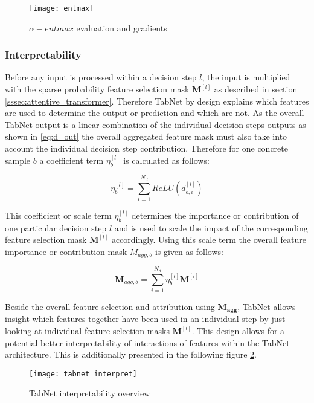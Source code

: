 \documentclass[../main.tex]{subfiles}
\begin{document}
\begin{figure}[H]
    \centering
    \texttt{[image: entmax]}    
    \caption{$\alpha-entmax$ evaluation and gradients}
    \label{fig:entmax}
\end{figure}

\subsubsection{Interpretability} \label{sssec:interpretability}

Before any input is processed within a decision step $l$, the input is multiplied with the sparse probability feature selection mask $\mathbf{M}^{[l]}$ as described in section \ref{sssec:attentive_transformer}. Therefore TabNet by design explains which features are used to determine the output or prediction and which are not. As the overall TabNet output is a linear combination of the individual decision steps outputs as shown in \ref{eq:d_out} the overall aggregated feature mask must also take into account the individual decision step contribution. Therefore for one concrete sample $b$ a coefficient term $\eta_b^{[l]}$ is calculated as follows:

\begin{equation}
    \eta_b^{[l]} = \sum_{i=1}^{N_d} ReLU(d_{b, i}^{[l]})
\end{equation}

This coefficient or scale term $\eta_b^{[l]}$ determines the importance or contribution of one particular decision step $l$ and is used to scale the impact of the corresponding feature selection mask $\mathbf{M}^{[l]}$ accordingly. Using this scale term the overall feature importance or contribution mask $M_{agg, b}$ is given as follows:

\begin{equation} \label{eq:aggregated_mask}
    \mathbf{M}_{agg, b} = \sum_{i=1}^{N_d} \eta_b^{[l]} \mathbf{M}^{[l]}
\end{equation}

Beside the overall feature selection and attribution using $\mathbf{M_{agg}}$, TabNet allows insight which features together have been used in an individual step by just looking at individual feature selection masks $\mathbf{M}^{[l]}$. This design allows for a potential better interpretability of interactions of features within the TabNet architecture. This is additionally presented in the following figure \ref{fig:tabnet_interpret}. 

\begin{figure}[H]
    \centering
    \texttt{[image: tabnet\_interpret]}    
    \caption{TabNet interpretability overview}
    \label{fig:tabnet_interpret}
\end{figure}
\end{document}
